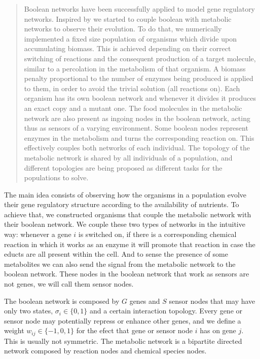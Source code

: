 \documentclass{article}
\begin{document}
\begin{abstract}
 
Boolean networks have been successfully applied to model gene regulatory networks. Inspired by \cite{Goudarzi} we started to couple boolean with metabolic 
networks to observe their evolution. To do that, we numerically implemented a fixed size population of organisms which divide upon accumulating biomass. 
This is achieved depending on their correct switching of reactions and the consequent production of a target molecule, similar to a percolation in the 
metabolism of that organism. A biomass penalty proportional to the number of enzymes being produced is applied to them, in order to avoid the trivial 
solution (all reactions on).  Each organism has its own boolean network and whenever it divides it produces an exact copy and a mutant one. The food 
molecules in the metabolic network are also present as ingoing nodes in the boolean network, acting thus as sensors of a varying environment. 
Some boolean nodes represent enzymes in the metabolism and turns the corresponding reaction on. This effectively couples both networks of each individual. 
The topology of the metabolic network is shared by all individuals of a population, and different topologies are being proposed as different tasks for the 
populations to solve.

\end{abstract}

The main idea consists of observing how the organisms in a population evolve their gene regulatory structure according to the availability of nutrients. 
To achieve that, we constructed organisms that couple the metabolic network with their boolean network. We couple these two types of networks in the intuitive 
way: whenever a gene $i$ is switched on, if there is a corresponding chemical reaction in which it works as an enzyme it will promote that reaction in case 
the educts are all present within the cell. And to sense the presence of some metabolites we can also send the signal from the metabolic 
network to the boolean network. These nodes in the boolean network that work as sensors are not genes, we will call them sensor nodes.

The boolean network is composed by $G$ genes and $S$ sensor nodes that may have only two states, $\sigma_i \in \{0,1\}$ and a certain interaction topology. 
Every gene or sensor node may potentially repress or enhance other genes, and we define a weight $w_{ij} \in \{-1,0,1\}$ for the efect that gene or sensor node $i$ has on 
gene $j$. This is usually not symmetric. The metabolic network is a bipartite directed network composed by reaction nodes and chemical species nodes. 
\end{document}
